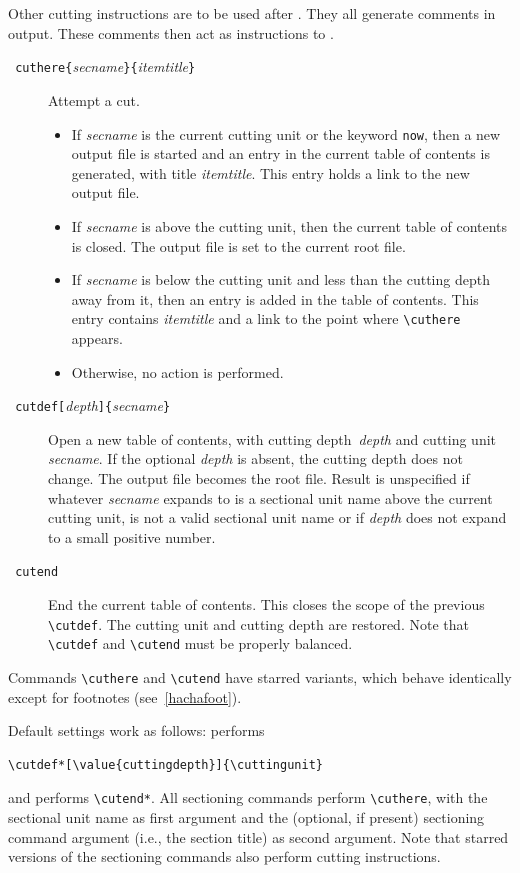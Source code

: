 Other cutting instructions are to be used after
\verb++. They all generate \html{} comments in \hevea{}
output.
These comments then act as instructions to {\hacha}.
\begin{description}
\item[{\tt{} cuthere\{}{\it secname}{\tt\}\{}{\it itemtitle}{\tt\}}]
   Attempt a cut.
   \begin{itemize}
   \item If {\it secname} is the current cutting  unit or
   the keyword \texttt{now}, then
   a new output file is started and an entry in the current table of contents
   is generated, with title {\it itemtitle}. This entry holds a link
   to the new output file.
   \item If {\it secname} is above the cutting  unit, then the
   current table of contents is closed. The output file is set to the
   current root file.
   \item If {\it secname} is below the cutting  unit and less than the
   cutting depth away from it, then an entry is added in the table of
   contents.
   This entry contains {\em itemtitle} and a link to the point where
   \verb+\cuthere+ appears.
   \item Otherwise, no action is performed.
   \end{itemize}

\item[{\tt{} cutdef[}{\it depth}{\tt]\{}{\it secname}{\tt \}}]
   Open a new table of contents, with cutting depth~{\em depth} and
   cutting unit {\em secname}. If the optional {\em depth} is absent,
   the cutting depth does not change.
   The output file becomes the root file.
   Result is unspecified if whatever {\em secname} expands to is
   a sectional unit name above
   the current cutting  unit, is not a valid sectional unit name or if
   {\em depth} does not expand to a small positive number.
\item[{\tt{} cutend}]
   End the current table of contents. This closes the scope of the
   previous \verb+\cutdef+. The cutting unit and cutting depth are
   restored.
   Note that \verb+\cutdef+ and \verb+\cutend+ must be properly balanced.
\end{description}
Commands \verb+\cuthere+ and \verb+\cutend+ have starred variants,
which behave identically except for footnotes (see~\ref{hachafoot}).

Default settings work as follows:
\verb++ performs
\begin{verbatim}
\cutdef*[\value{cuttingdepth}]{\cuttingunit}
\end{verbatim}
and \verb++ performs \verb+\cutend*+.
All sectioning commands perform \verb+\cuthere+,
with the sectional unit name as first argument and the (optional, if
present) sectioning
command argument (i.e., the section title) as second argument.
Note that starred versions of the sectioning commands also perform
cutting instructions.

